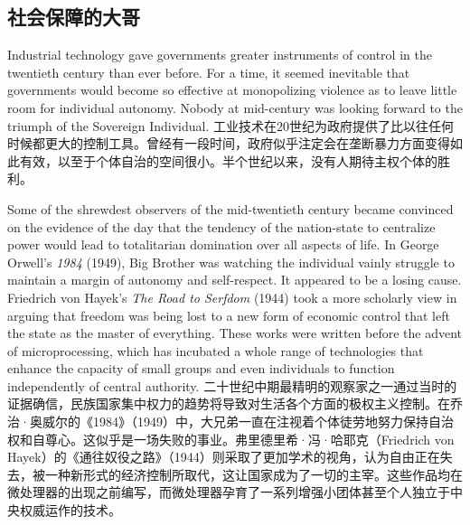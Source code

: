 \begin{Parallel}{97mm}{45mm}
\subsection{社会保障的大哥}

  \ParallelLText
  {Industrial technology gave governments greater instruments of control in the twentieth century than ever before. For a time, it seemed inevitable that governments would become so effective at monopolizing violence as to leave little room for individual autonomy. Nobody at mid-century was looking forward to the triumph of the Sovereign Individual.  }  
  \ParallelRText
  {\small 工业技术在20世纪为政府提供了比以往任何时候都更大的控制工具。曾经有一段时间，政府似乎注定会在垄断暴力方面变得如此有效，以至于个体自治的空间很小。半个世纪以来，没有人期待主权个体的胜利。}
  \ParallelPar


  \ParallelLText
{Some of the shrewdest observers of the mid-twentieth century became convinced on the evidence of the day that the tendency of the nation-state to centralize power would lead to totalitarian domination over all aspects of life. In George Orwell's \emph{1984} (1949), Big Brother was watching the individual vainly struggle to maintain a margin of autonomy and self-respect. It appeared to be a losing cause. Friedrich von Hayek's \emph{The Road to Serfdom} (1944) took a more scholarly view in arguing that freedom was being lost to a new form of economic control that left the state as the master of everything. These works were written before the advent of microprocessing, which has incubated a whole range of technologies that enhance the capacity of small groups and even individuals to function independently of central authority.  }  
  \ParallelRText
  {\small 二十世纪中期最精明的观察家之一通过当时的证据确信，民族国家集中权力的趋势将导致对生活各个方面的极权主义控制。在乔治·奥威尔的《1984》（1949）中，大兄弟一直在注视着个体徒劳地努力保持自治权和自尊心。这似乎是一场失败的事业。弗里德里希·冯·哈耶克（Friedrich von Hayek）的《通往奴役之路》（1944）则采取了更加学术的视角，认为自由正在失去，被一种新形式的经济控制所取代，这让国家成为了一切的主宰。这些作品均在微处理器的出现之前编写，而微处理器孕育了一系列增强小团体甚至个人独立于中央权威运作的技术。}
  \ParallelPar



\end{Parallel}
